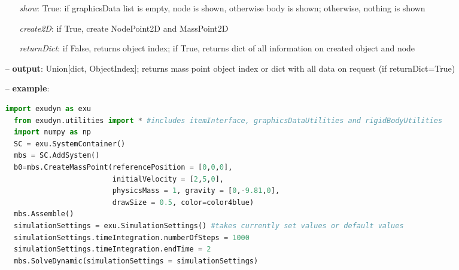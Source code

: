 \begin{itemize}[leftmargin=0.7cm]
\begin{itemize}[leftmargin=1.2cm]
\item[]{\it show}: True: if graphicsData list is empty, node is shown, otherwise body is shown; otherwise, nothing is shown
\item[]{\it create2D}: if True, create NodePoint2D and MassPoint2D
\item[]{\it returnDict}: if False, returns object index; if True, returns dict of all information on created object and node
\end{itemize}
\item[--]
{\bf output}: Union[dict, ObjectIndex]; returns mass point object index or dict with all data on request (if returnDict=True)
\item[--]
{\bf example}: \vspace{-12pt}\ei\begin{lstlisting}[language=Python, xleftmargin=36pt]
  import exudyn as exu
  from exudyn.utilities import * #includes itemInterface, graphicsDataUtilities and rigidBodyUtilities
  import numpy as np
  SC = exu.SystemContainer()
  mbs = SC.AddSystem()
  b0=mbs.CreateMassPoint(referencePosition = [0,0,0],
                         initialVelocity = [2,5,0],
                         physicsMass = 1, gravity = [0,-9.81,0],
                         drawSize = 0.5, color=color4blue)
  mbs.Assemble()
  simulationSettings = exu.SimulationSettings() #takes currently set values or default values
  simulationSettings.timeIntegration.numberOfSteps = 1000
  simulationSettings.timeIntegration.endTime = 2
  mbs.SolveDynamic(simulationSettings = simulationSettings)
\end{lstlisting}\vspace{-24pt}\bi\item[]\vspace{-24pt}\vspace{12pt}\end{itemize}
%

